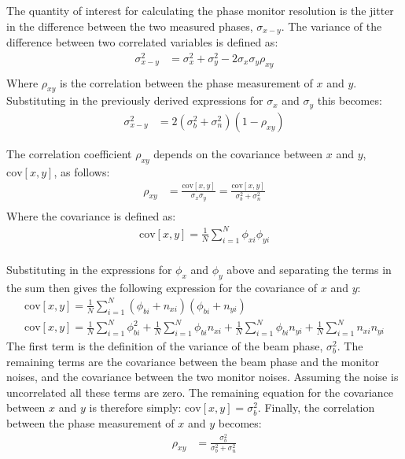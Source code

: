 The quantity of interest for calculating the phase monitor resolution is the jitter in the difference between the two measured phases, \(\sigma_{x-y}\). The variance of the difference between two correlated variables is defined as:
\begin{align}
\sigma_{x-y}^2 &= \sigma_x^2 + \sigma_y^2 - 2\sigma_x\sigma_y\rho_{xy} \\
\end{align}
Where \(\rho_{xy}\) is the correlation between the phase measurement of \(x\) and \(y\). Substituting in the previously derived expressions for \(\sigma_x\) and \(\sigma_y\) this becomes:
\begin{align}
\sigma_{x-y}^2 &= 2(\sigma_b^2 + \sigma_n^2)(1-\rho_{xy})
\end{align}

The correlation coefficient \(\rho_{xy}\) depends on the covariance between \(x\) and \(y\), \(\mathrm{cov}[x,y]\), as follows:
\begin{align}
\rho_{xy} &= \frac{\mathrm{cov}[x,y]}{\sigma_x\sigma_y} = \frac{\mathrm{cov}[x,y]}{\sigma_b^2+\sigma_n^2} \\
\end{align}
Where the covariance is defined as:
\begin{align}
\mathrm{cov}[x,y] = \frac{1}{N}\sum_{i=1}^{N}\phi_{xi}\phi_{yi} \\
\end{align}

Substituting in the expressions for \(\phi_{x}\) and \(\phi_{y}\) above and separating the terms in the sum then gives the following expression for the covariance of \(x\) and \(y\):
\begin{equation}
\begin{gathered}
\mathrm{cov}[x,y] = \frac{1}{N}\sum_{i=1}^{N}(\phi_{bi}+n_{xi})(\phi_{bi}+n_{yi}) \\
\mathrm{cov}[x,y] = \frac{1}{N}\sum_{i=1}^{N}\phi_{bi}^2 + \frac{1}{N}\sum_{i=1}^{N}\phi_{bi}n_{xi} + \frac{1}{N}\sum_{i=1}^{N}\phi_{bi}n_{yi} + \frac{1}{N}\sum_{i=1}^{N}n_{xi}n_{yi} 
\end{gathered}
\end{equation}
The first term is the definition of the variance of the beam phase, \(\sigma_b^2\). The remaining terms are the covariance between the beam phase and the monitor noises, and the covariance between the two monitor noises. Assuming the noise is uncorrelated all these terms are zero. The remaining equation for the covariance between \(x\) and \(y\) is therefore simply: \(\mathrm{cov}[x,y] = \sigma_b^2\). Finally, the correlation between the phase measurement of \(x\) and \(y\) becomes:
\begin{align}
\rho_{xy} &= \frac{\sigma_b^2}{\sigma_b^2 + \sigma_n^2}
\label{e:corrVsResolution}
\end{align}

